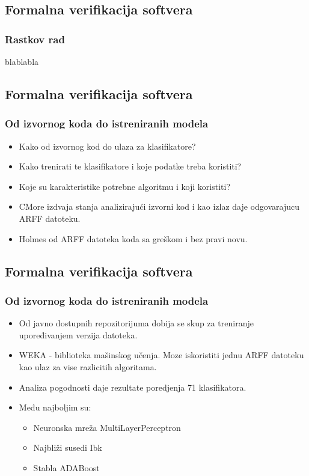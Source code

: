 \documentclass[11pt]{beamer}
\theoremstyle{definition}
\begin{document}
\subsection{Formalna verifikacija softvera}
\label{subsec:formalna-verifikacija}
\begin{frame}
\frametitle{Rastkov rad}
blablabla
\end{frame}

\subsection{Formalna verifikacija softvera}
\label{subsec:formalna-verifikacija}
\begin{frame}
\frametitle{Od izvornog koda do istreniranih modela}


\begin{itemize}
\item Kako od izvornog kod do ulaza za klasifikatore?
\item Kako trenirati te klasifikatore i koje podatke treba koristiti?
\item Koje su karakteristike potrebne algoritmu i koji koristiti?



\item  CMore izdvaja stanja analizirajući izvorni kod
i kao izlaz daje odgovarajucu ARFF datoteku.



\item Holmes od ARFF datoteka koda sa greškom i bez pravi novu.
\end{itemize}
\end{frame}

\subsection{Formalna verifikacija softvera}
\label{subsec:formalna-verifikacija}
\begin{frame}
\frametitle{Od izvornog koda do istreniranih modela}
\begin{itemize}
\item Od javno dostupnih repozitorijuma dobija se skup za treniranje upoređivanjem verzija datoteka.

\item WEKA - biblioteka mašinskog učenja.
Moze iskoristiti jednu ARFF datoteku kao ulaz za vise razlicitih algoritama.

\item Analiza pogodnosti daje rezultate poredjenja 71 klasifikatora.

\item Među najboljim su:
\begin{itemize}
	\item Neuronska mreža MultiLayerPerceptron
	\item Najbliži susedi Ibk
	\item Stabla ADABoost
\end{itemize}
\end{itemize}
\end{frame}
\end{document}
